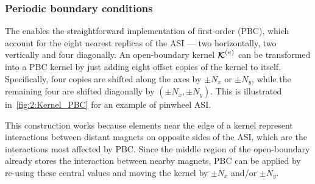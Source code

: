 \subsubsection{Periodic boundary conditions}\label{sec:2:Kernels:PBC}
The  enables the straightforward implementation of first-order  (PBC), which account for the eight nearest replicas of the ASI --- two horizontally, two vertically and four diagonally.
An open-boundary kernel $\boldsymbol{\mathbf{\mathcal{K}}}^{(\kappa)}$ can be transformed into a PBC kernel by just adding eight offset copies of the kernel to itself.
Specifically, four copies are shifted along the axes by $\pm N_x$ or $\pm N_y$, while the remaining four are shifted diagonally by $(\pm N_x, \pm N_y)$.
This is illustrated in~\cref{fig:2:Kernel_PBC} for an example of pinwheel ASI. \par
This construction works because elements near the edge of a kernel represent interactions between distant magnets on opposite sides of the ASI, which are the interactions most affected by PBC.
Since the middle region of the open-boundary  already stores the interaction between nearby magnets, PBC can be applied by re-using these central values and moving the kernel by $\pm N_x$ and/or $\pm N_y$.

\vspace{-1.5em}
\vspace{-1em}

